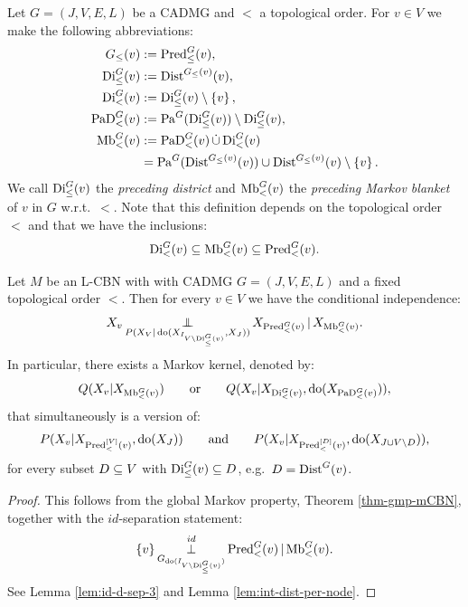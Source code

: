 \begin{Def}
    Let $G=(J,V,E,L)$ be a CADMG and $<$ a topological order.
    For $v \in  V$ we make the following abbreviations:
    \begin{align*}
        G_\le(v) &:= \Pred^G_\le(v), \\%
        \Di^G_\le(v) &:= \Dist^{G_\le(v)}(v),\\%
        \Di^G_<(v) &:= \Di^G_\le(v) \sm \lC v \rC, \\%
        \PaD^G_<(v) &:= \Pa^G(\Di^G_\le(v)) \sm \Di^G_\le(v), \\%
        \MBl^G_<(v) &:= \PaD^G_<(v) \dcup \Di^G_<(v) \\ %
                    &= \Pa^G(\Dist^{G_\le(v)}(v)) \cup \Dist^{G_\le(v)}(v) \sm \lC v \rC.
    \end{align*}
    We call $\mathrm{Di}^G_\le(v)$ the \emph{preceding district} and
    $\mathrm{Mb}^G_<(v)$ the  \emph{preceding Markov blanket} of $v$ in $G$ w.r.t.\ $<$.
    Note that this definition depends on the topological order $<$ and that we have the inclusions: 
    \[\mathrm{Di}^G_<(v) \subseteq  \mathrm{Mb}^G_<(v) \subseteq  \mathrm{Pred}_<^G(v).\] 
\end{Def}



\begin{Prp}
    \label{prp:ioLMP}
    Let $M$ be an L-CBN with with \observational CADMG $G=(J,V,E,L)$ and a fixed topological order $<$.
    Then for every $v \in V$ we have the conditional independence:
    \[ X_v \operatorname*{\perp\mkern-11mu\perp}_{P(X_V|\operatorname{do}(X_{I_{V \setminus \mathrm{Di}^G_\le(v)}},X_J))}  X_{\mathrm{Pred}^G_<(v)} \operatorname*{|} X_{\mathrm{Mb}^G_<(v)}.\]
    In particular, 
    there exists a Markov kernel, denoted by: 
    \[Q(X_v|X_{\mathrm{Mb}^G_<(v)}) \qquad \text{or} \qquad Q(X_v|X_{\mathrm{Di}^G_<(v)},\operatorname{do}(X_{\mathrm{PaD}^G_<(v)})), \] 
    that simultaneously is a version of:
    \[ P(X_v|X_{\mathrm{Pred}^{[V]}_<(v)},\operatorname{do}(X_J)) \qquad \text{and} \qquad P(X_v|X_{\mathrm{Pred}^{[D]}_<(v)},\operatorname{do}(X_{J \cup V\setminus D})),\]
    for every subset $D \subseteq V$ with $\mathrm{Di}^G_\le(v) \subseteq D$, e.g.\ $D=\mathrm{Dist}^G(v)$.
    \begin{proof}
        This follows from the global Markov property, Theorem \ref{thm-gmp-mCBN}, together with the $id$-separation statement:
        \[ \left \{ v\right \} \operatorname*{\perp}^{id}_{ G_{\operatorname{do}(I_{V \setminus \mathrm{Di}^G_\le(v)})}}  \mathrm{Pred}^G_<(v) \operatorname*{|} \mathrm{Mb}^G_<(v).\]
        See Lemma \ref{lem:id-d-sep-3} and Lemma \ref{lem:int-dist-per-node}.
    \end{proof}
\end{Prp}

